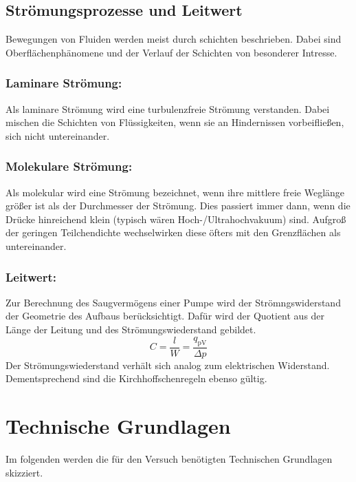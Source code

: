 \subsection{Strömungsprozesse und Leitwert}
Bewegungen von Fluiden werden meist durch schichten beschrieben. Dabei sind Oberflächenphänomene und der Verlauf der Schichten von besonderer Intresse.
\subsubsection{Laminare Strömung:}
Als laminare Strömung wird eine turbulenzfreie Strömung verstanden. Dabei mischen die Schichten von Flüssigkeiten, wenn sie an Hindernissen vorbeifließen, sich nicht untereinander.

\subsubsection{Molekulare Strömung:}
Als molekular wird eine Strömung bezeichnet, wenn ihre mittlere freie Weglänge größer ist als der Durchmesser der Strömung. Dies passiert immer dann, wenn die Drücke hinreichend klein (typisch wären Hoch-/Ultrahochvakuum) sind. Aufgroß der geringen Teilchendichte wechselwirken diese öfters mit den Grenzflächen als untereinander.

\subsubsection{Leitwert:}
Zur Berechnung des Saugvermögens einer Pumpe wird der Strömngswiderstand der Geometrie des Aufbaus berücksichtigt. Dafür wird der Quotient aus der Länge der Leitung und des Strömungswiederstand gebildet.
\begin{equation}
  C = \frac{l}{W} = \frac{q_\text{pV}}{\Delta p}
\end{equation}
Der Strömungswiederstand verhält sich analog zum elektrischen Widerstand. Dementsprechend sind die Kirchhoffschenregeln ebenso gültig.

\section{Technische Grundlagen}
Im folgenden werden die für den Versuch benötigten Technischen Grundlagen skizziert.
